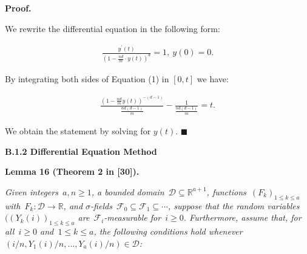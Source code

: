 


\par\medskip\noindent\textbf{Proof.}\par



We rewrite the differential equation in the following form:\par


\[\begin{gathered}
\displaystyle\frac{y^{\prime}(t)}{\left(1-\frac{nd}{m}\cdot y(t)\right)^{d}}=1,\ y(0)=0.
\end{gathered}\]


By integrating both sides of Equation (1) in $[0,t]$ we have:\par


\[\begin{gathered}
\displaystyle\frac{\left(1-\frac{nd}{m}y(t)\right)^{-(d-1)}}{\frac{nd(d-1)}{m}}-\frac{1}{\frac{nd(d-1)}{m}}=t.
\end{gathered}\]


We obtain the statement by solving for $y(t)$.
\ensuremath{\blacksquare}\par






\par\medskip\noindent\textbf{B.1.2 Differential Equation Method}\par





\par\medskip\noindent\textbf{\textbf{Lemma 16}\textbf{ }(Theorem 2 in [30])\textbf{.}}\par



\emph{Given integers $a,n\geq 1$,
a bounded domain $\mathcal{D}\subseteq\mathbb{R}^{a+1}$,
functions $(F_{k})_{1\leq k\leq a}$ with $F_{k}:\mathcal{D}\to\mathbb{R}$,
and $\sigma$-fields $\mathcal{F}_{0}\subseteq\mathcal{F}_{1}\subseteq\cdots$,
suppose that the random variables $((Y_{k}(i))_{1\leq k\leq a}$ are $\mathcal{F}_{i}$-measurable for $i\geq 0$.
Furthermore, assume that, for all $i\geq 0$ and $1\leq k\leq a$, the following
conditions hold whenever $(i/n,Y_{1}(i)/n,...,Y_{a}(i)/n)\in\mathcal{D}$:}\par


